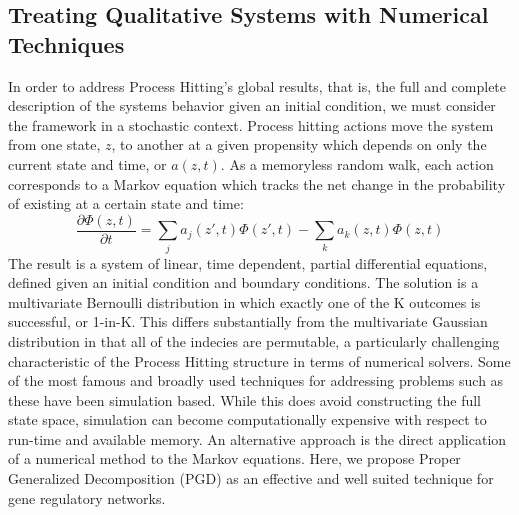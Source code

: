 \documentclass{article}
\begin{document}
\subsection{Treating Qualitative Systems with Numerical Techniques}

In order to address Process Hitting's global results, that is, the full and complete description of the systems behavior given an initial condition, we must consider the framework in a stochastic context. Process hitting actions move the system from one state, $z$, to another at a given propensity which depends on only the current state and time, or $a(z,t)$. As a memoryless random walk, each action corresponds to a Markov equation which tracks the net change in the probability of existing at a certain state and time: 
\[
\frac{\partial \Phi(z,t)}{\partial t} = \sum_j  a_j(z\prime,t)\Phi(z\prime,t) -\sum_k a_k(z,t)\Phi(z,t)
\]
The result is a system of linear, time dependent, partial differential equations, defined given an initial condition and boundary conditions. The solution is a multivariate Bernoulli distribution in which exactly one of the K outcomes is successful, or 1-in-K. This differs substantially from the multivariate Gaussian distribution in that all of the indecies are permutable, a particularly challenging characteristic of the Process Hitting structure in terms of numerical solvers. Some of the most famous and broadly used techniques for addressing problems such as these have been simulation based. While this does avoid constructing the full state space, simulation can become computationally expensive with respect to run-time and available memory. An alternative approach is the direct application of a numerical method to the Markov equations. Here, we propose Proper Generalized Decomposition (PGD) as an effective and well suited technique for gene regulatory networks.
\end{document}
